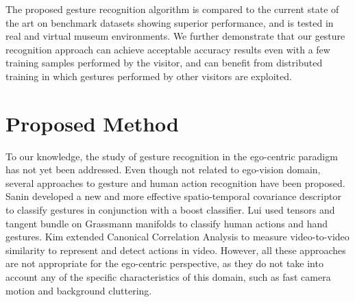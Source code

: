 The proposed gesture recognition algorithm is compared to the current state of the art on benchmark datasets showing superior performance, and is tested in real and virtual museum environments. We further demonstrate that our gesture recognition approach can achieve acceptable accuracy results even with a few training samples performed by the visitor, and can benefit from distributed training in which gestures performed by other visitors are exploited.


\section{Proposed Method}
To our knowledge, the study of gesture recognition in the ego-centric paradigm has not yet been addressed. Even though not related to ego-vision domain, several approaches to gesture and human action recognition have been proposed. Sanin \etal \cite{sanin2013spatio} developed a new and more effective spatio-temporal covariance descriptor to classify gestures in conjunction with a boost classifier. Lui \etal \cite{lui2010action, lui2011tangent} used tensors and tangent bundle on Grassmann manifolds to classify human actions and hand gestures. Kim \etal \cite{kim2009canonical} extended Canonical Correlation Analysis to measure video-to-video similarity to represent and detect actions in video. However, all these approaches are not appropriate for the ego-centric perspective, as they do not take into account any of the specific characteristics of this domain, such as fast camera motion and background cluttering.
